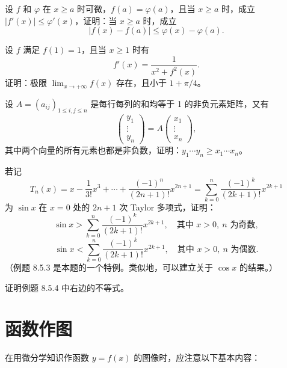 \begin{xexercise}[12]
设 $f$ 和 $\varphi$ 在 $x\ge a$ 时可微，$f(a)=\varphi(a)$，且当 $x\ge a$ 时，成立 $|f'(x)|\le\varphi'(x)$，证明：当 $x\ge a$ 时，成立
  \[
    |f(x)-f(a)|\le\varphi(x)-\varphi(a).
  \]
\end{xexercise}

\begin{xexercise}[13]
设 $f$ 满足 $f(1)=1$，且当 $x\ge1$ 时有
  \[
    f'(x)=\frac1{x^2+f^2(x)}.
  \]
  证明：极限 $\displaystyle\lim_{x\to+\infty}f(x)$ 存在，且小于 $1+\pi/4$。
\end{xexercise}

\begin{xexercise}[14]
设 $A=(a_{ij})_{1\le i,j\le n}$ 是每行每列的和均等于 1 的非负元素矩阵，又有
  \[
    \begin{pmatrix}y_1\\\vdots\\y_n\end{pmatrix}
    =A\begin{pmatrix}x_1\\\vdots\\x_n\end{pmatrix},
  \]
  其中两个向量的所有元素也都是非负数，证明：$y_1\cdots y_n\ge x_1\cdots x_n$。
\end{xexercise}

\begin{xexercise}[15]
若记
  \[
    T_n(x)=x-\frac1{3!}x^3+\cdots+\frac{(-1)^n}{(2n+1)!}x^{2n+1}
    =\sum_{k=0}^n\frac{(-1)^k}{(2k+1)!}x^{2k+1}
  \]
  为 $\sin x$ 在 $x=0$ 处的 $2n+1$ 次 Taylor 多项式，证明：
  \[
    \sin x>\sum_{k=0}^n\frac{(-1)^k}{(2k+1)!}x^{2k+1},
    \quad\text{其中 }x>0,\ n\text{ 为奇数},
  \]
  \[
    \sin x<\sum_{k=0}^n\frac{(-1)^k}{(2k+1)!}x^{2k+1},
    \quad\text{其中 }x>0,\ n\text{ 为偶数}.
  \]
  （例题 8.5.3 是本题的一个特例。类似地，可以建立关于 $\cos x$ 的结果。）
\end{xexercise}

\begin{xexercise}[16]
证明例题 8.5.4 中右边的不等式。
\end{xexercise}

\section{函数作图}

在用微分学知识作函数 $y=f(x)$ 的图像时，应注意以下基本内容：

